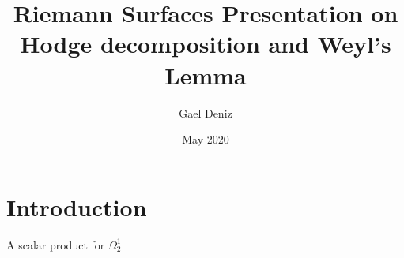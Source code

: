 \documentclass{article}
\title{Riemann Surfaces Presentation on Hodge decomposition and Weyl's Lemma}
\author{Gael Deniz}
\date{May 2020}
\begin{document}
\maketitle

\section{Introduction}

\begin{frame}{A scalar product for $\Omega^1_2$}

\end{frame}

\
\end{document}
